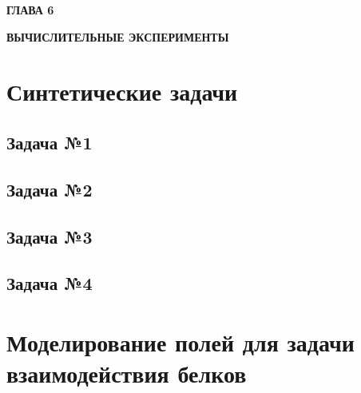 \newpage
\begin{center}
	\textbf{\large ГЛАВА 6}

	\textbf{\large ВЫЧИСЛИТЕЛЬНЫЕ ЭКСПЕРИМЕНТЫ}
\end{center}

\section{Синтетические задачи}

\subsection{Задача №1}

\subsection{Задача №2}

\subsection{Задача №3}

\subsection{Задача №4}

\section{Моделирование полей для задачи взаимодействия белков}